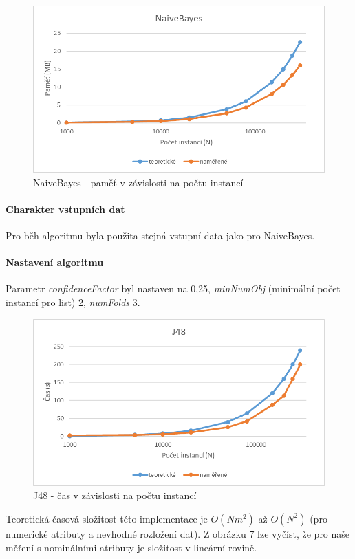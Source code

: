 \documentclass[12pt]{article}
\begin{document}
\begin{figure}[hbp]
  \centering
  \includegraphics[scale=1]{img/nbp.png}
  \caption{NaiveBayes - paměť v závislosti na počtu instancí}
\end{figure}

\newpage
{}
\paragraph{Charakter vstupních dat}
Pro běh algoritmu byla použita stejná vstupní data jako pro NaiveBayes.
\paragraph{Nastavení algoritmu}
Parametr \textit{confidenceFactor} byl nastaven na 0,25, \textit{minNumObj} (minimální počet instancí pro list) 2, \textit{numFolds} 3. 
\begin{figure}[hbp]
  \centering
  \includegraphics[scale=1]{img/j48.png}
  \caption{J48 - čas v závislosti na počtu instancí}
\end{figure}
Teoretická časová složitost této implementace je $O(Nm^2)$ až $O(N^2)$ (pro numerické atributy a nevhodné rozložení dat). Z obrázku 7 lze vyčíst, že pro naše měření s nominálními atributy je složitost v lineární rovině. 
\end{document}
